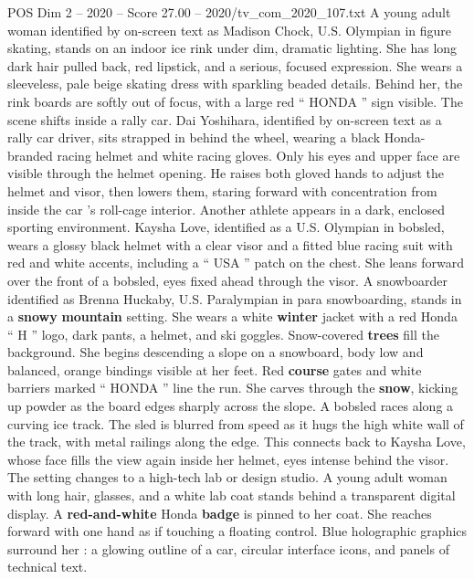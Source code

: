 \begin{textsample}{POS Dim 2 – 2020 – Score 27.00 – 2020/tv\_com\_2020\_107.txt}  \label{ex:f2_pos_044}
A young adult woman identified by on-screen text as Madison Chock, U.S.
Olympian in figure skating, stands on an indoor ice rink under dim, dramatic lighting.
She has long dark hair pulled back, red lipstick, and a serious, focused expression.
She wears a sleeveless, pale beige skating dress with sparkling beaded details.
Behind her, the rink boards are softly out of focus, with a large red “ HONDA ” sign visible.
The scene shifts inside a rally car.
Dai Yoshihara, identified by on-screen text as a rally car driver, sits strapped in behind the wheel, wearing a black Honda-branded racing helmet and white racing gloves.
Only his eyes and upper face are visible through the helmet opening.
He raises both gloved hands to adjust the helmet and visor, then lowers them, staring forward with concentration from inside the car ’s roll-cage interior.
Another athlete appears in a dark, enclosed sporting environment.
Kaysha Love, identified as a U.S.
Olympian in bobsled, wears a glossy black helmet with a clear visor and a fitted blue racing suit with red and white accents, including a “ USA ” patch on the chest.
She leans forward over the front of a bobsled, eyes fixed ahead through the visor.
A snowboarder identified as Brenna Huckaby, U.S.
Paralympian in para snowboarding, stands in a \textbf{snowy} \textbf{mountain} setting.
She wears a white \textbf{winter} jacket with a red Honda “ H ” logo, dark pants, a helmet, and ski goggles.
Snow-covered \textbf{trees} fill the background.
She begins descending a slope on a snowboard, body low and balanced, orange bindings visible at her feet.
Red \textbf{course} gates and white barriers marked “ HONDA ” line the run.
She carves through the \textbf{snow}, kicking up powder as the board edges sharply across the slope.
A bobsled races along a curving ice track.
The sled is blurred from speed as it hugs the high white wall of the track, with metal railings along the edge.
This connects back to Kaysha Love, whose face fills the view again inside her helmet, eyes intense behind the visor.
The setting changes to a high-tech lab or design studio.
A young adult woman with long hair, glasses, and a white lab coat stands behind a transparent digital display.
A \textbf{red-and-white} Honda \textbf{badge} is pinned to her coat.
She reaches forward with one hand as if touching a floating control.
Blue holographic graphics surround her : a glowing outline of a car, circular interface icons, and panels of technical text.

\end{textsample}
